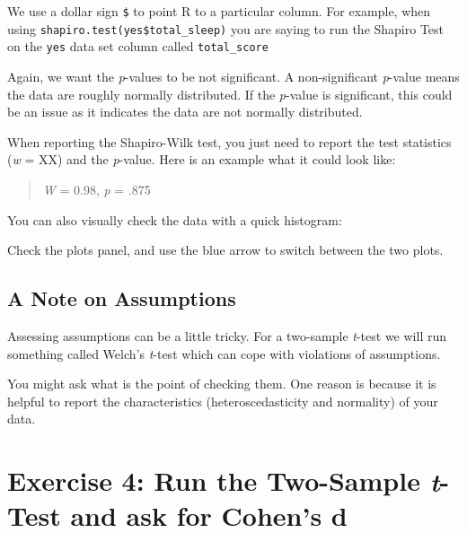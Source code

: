 \documentclass[
]{book}
\newenvironment{Shaded}{\begin{snugshade}}{\end{snugshade}}
\newcommand{\FunctionTok}[1]{\textcolor[rgb]{0.13,0.29,0.53}{\textbf{#1}}}
\newcommand{\NormalTok}[1]{#1}
\newcommand{\SpecialCharTok}[1]{\textcolor[rgb]{0.81,0.36,0.00}{\textbf{#1}}}
\let\oldsection\section
\renewcommand{\section}{\needspace{5\baselineskip}\oldsection}
\let\oldsubsection\subsection
\renewcommand{\subsection}{\needspace{3\baselineskip}\oldsubsection}  %
\begin{document}
We use a dollar sign \texttt{\$} to point R to a particular column. For example, when using \texttt{shapiro.test(yes\$total\_sleep)} you are saying to run the Shapiro Test on the \texttt{yes} data set column called \texttt{total\_score}

Again, we want the \emph{p}-values to be not significant. A non-significant \emph{p}-value means the data are roughly normally distributed. If the \emph{p}-value is significant, this could be an issue as it indicates the data are not normally distributed.

When reporting the Shapiro-Wilk test, you just need to report the test statistics (\emph{w} = XX) and the \emph{p}-value. Here is an example what it could look like:

\begin{quote}
\emph{W} = 0.98, \emph{p} = .875
\end{quote}

You can also visually check the data with a quick histogram:

\begin{Shaded}
\end{Shaded}

Check the plots panel, and use the blue arrow to switch between the two plots.

\subsection{A Note on Assumptions}\label{a-note-on-assumptions}

Assessing assumptions can be a little tricky. For a two-sample \emph{t}-test we will run something called Welch's \emph{t}-test which can cope with violations of assumptions.

You might ask what is the point of checking them. One reason is because it is helpful to report the characteristics (heteroscedasticity and normality) of your data.

\section{\texorpdfstring{Exercise 4: Run the Two-Sample \emph{t}-Test and ask for Cohen's d}{Exercise 4: Run the Two-Sample t-Test and ask for Cohen's d}}\label{exercise-4-run-the-two-sample-t-test-and-ask-for-cohens-d}
\end{document}
